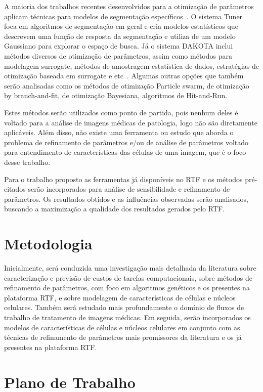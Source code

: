 \documentclass[a4paper,10pt]{article}
\begin{document}
A maioria dos trabalhos recentes desenvolvidos para a otimização de parâmetros aplicam técnicas para modelos de segmentação específicos~\cite{kumar2003discriminative, szummer2008learning, mcintosh2007single, schultz2013open}. O sistema Tuner~\cite{torsney2011tuner} foca em algoritmos de segmentação em geral e cria modelos estatísticos que descrevem uma função de resposta da segmentação e utiliza de um modelo Gaussiano para explorar o espaço de busca. Já o sistema DAKOTA inclui métodos diversos de otimização de parâmetros, assim como métodos para modelagem surrogate, métodos de amostragem estatística de dados, estratégias de otimização baseada em surrogate e etc~\cite{giunta2002use}. Algumas outras opções que também serão analisadas como os métodos de otimização Particle swarm, de otimização by branch-and-fit, de otimização Bayesiana, algoritmos de Hit-and-Run.

Estes métodos serão utilizados como ponto de partida, pois nenhum deles é voltado para a análise de imagens médicas de patologia, logo não são diretamente aplicáveis. Além disso, não existe uma ferramenta ou estudo que aborda o problema de refinamento de parâmetros e/ou de análise de parâmetros voltado para entendimento de características das células de uma imagem, que é o foco desse trabalho.

Para o trabalho proposto as ferramentas já disponíveis no RTF e os métodos pré-citados serão incorporados para análise de sensibilidade e refinamento de parâmetros. Os resultados obtidos e as influências observadas serão analisados, buscando a maximização a qualidade dos resultados gerados pelo RTF. 

\section{Metodologia}
Inicialmente, será conduzida uma investigação mais detalhada da literatura sobre caracterização e previsão de custos de tarefas computacionais, sobre métodos de refinamento de parâmetros, com foco em algoritmos genéticos e os presentes na plataforma RTF, e sobre modelagem de características de células e núcleos celulares. Também será estudado mais profundamente o domínio de fluxos de trabalho de tratamento de imagens médicas. Em seguida, serão incorporados os modelos de características de células e núcleos celulares em conjunto com as técnicas de refinamento de parâmetros mais promissores da literatura e os já presentes na plataforma RTF.

\section{Plano de Trabalho}
\end{document}
